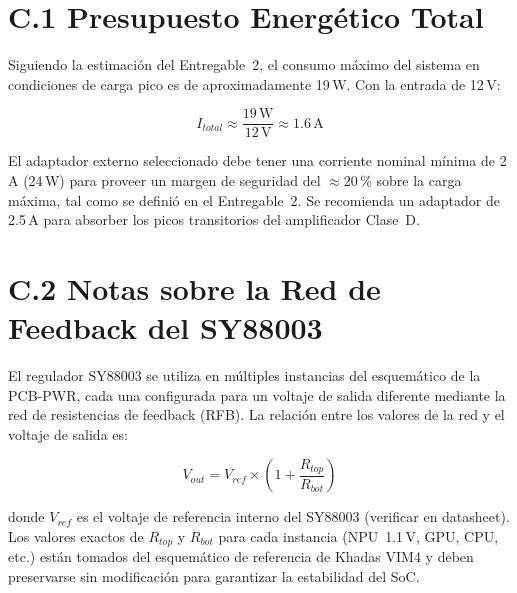 \section*{C.1 Presupuesto Energético Total}

Siguiendo la estimación del Entregable~2, el consumo máximo del sistema en
condiciones de carga pico es de aproximadamente 19\,W. Con la entrada de 12\,V:

\[
  I_{total} \approx \frac{19\,\text{W}}{12\,\text{V}} \approx 1.6\,\text{A}
\]

El adaptador externo seleccionado debe tener una corriente nominal mínima de 2\,A
(24\,W) para proveer un margen de seguridad del $\approx$20\,\% sobre la carga
máxima, tal como se definió en el Entregable~2. Se recomienda un adaptador de 2.5\,A
para absorber los picos transitorios del amplificador Clase~D.

\section*{C.2 Notas sobre la Red de Feedback del SY88003}

El regulador SY88003 se utiliza en múltiples instancias del esquemático de la
PCB-PWR, cada una configurada para un voltaje de salida diferente mediante la red
de resistencias de feedback (RFB). La relación entre los valores de la red y el
voltaje de salida es:

\[
  V_{out} = V_{ref} \times \left(1 + \frac{R_{top}}{R_{bot}}\right)
\]

donde $V_{ref}$ es el voltaje de referencia interno del SY88003 (verificar en
datasheet). Los valores exactos de $R_{top}$ y $R_{bot}$ para cada instancia
(NPU~1.1\,V, GPU, CPU, etc.) están tomados del esquemático de referencia
de Khadas VIM4 y deben preservarse sin modificación para garantizar la
estabilidad del SoC.
